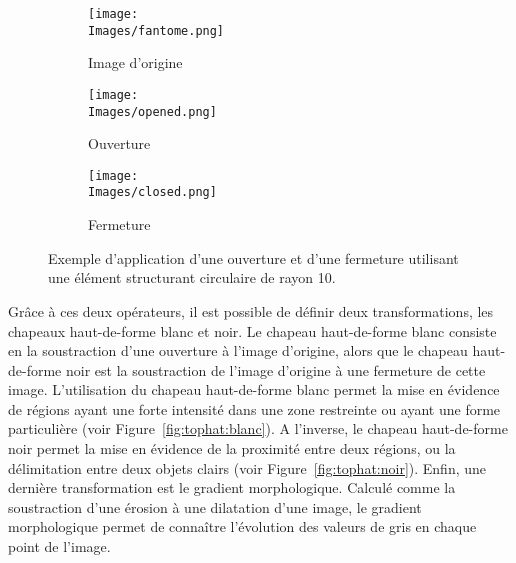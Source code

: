 \documentclass[\main/main.tex]{subfiles}
\providecommand{\Images}{\main/Figures/intro_seg}
\begin{document}
\begin{figure}[h]
    \centering
    \begin{subfigure}[b]{0.30\textwidth}
       \caption{
       Image d'origine
            }
       \centering \texttt{[image: \\Images/fantome.png]}
    \end{subfigure}
    \begin{subfigure}[b]{0.30\textwidth}
       \caption{
        \label{fig:ouverture}
            Ouverture
            }
       \centering \texttt{[image: \\Images/opened.png]}
    \end{subfigure}
    \begin{subfigure}[b]{0.30\textwidth}
       \caption{
        \label{fig:fermeture}
            Fermeture
            }
       \centering \texttt{[image: \\Images/closed.png]}
    \end{subfigure}
    \caption{
        Exemple d'application d'une ouverture et d'une fermeture utilisant une élément structurant circulaire de rayon 10.
    }
    
\end{figure}
%
Grâce à ces deux opérateurs, il est possible de définir deux transformations, les chapeaux haut-de-forme blanc et noir.
%
Le chapeau haut-de-forme blanc consiste en la soustraction d'une ouverture à l'image d'origine, alors que le chapeau haut-de-forme noir est la soustraction de l'image d'origine à une fermeture de cette image.
%
L'utilisation du chapeau haut-de-forme blanc permet la mise en évidence de régions ayant une forte intensité dans une zone restreinte ou ayant une forme particulière (voir Figure~\ref{fig:tophat:blanc}).
%
A l'inverse, le chapeau haut-de-forme noir permet la mise en évidence de la proximité entre deux régions, ou la délimitation entre deux objets clairs (voir Figure~\ref{fig:tophat:noir}).
%
Enfin, une dernière transformation est le gradient morphologique.
%
Calculé comme la soustraction d'une érosion à une dilatation d'une image,
le gradient morphologique permet de connaître l'évolution des valeurs de gris en chaque point de l'image.
\end{document}
